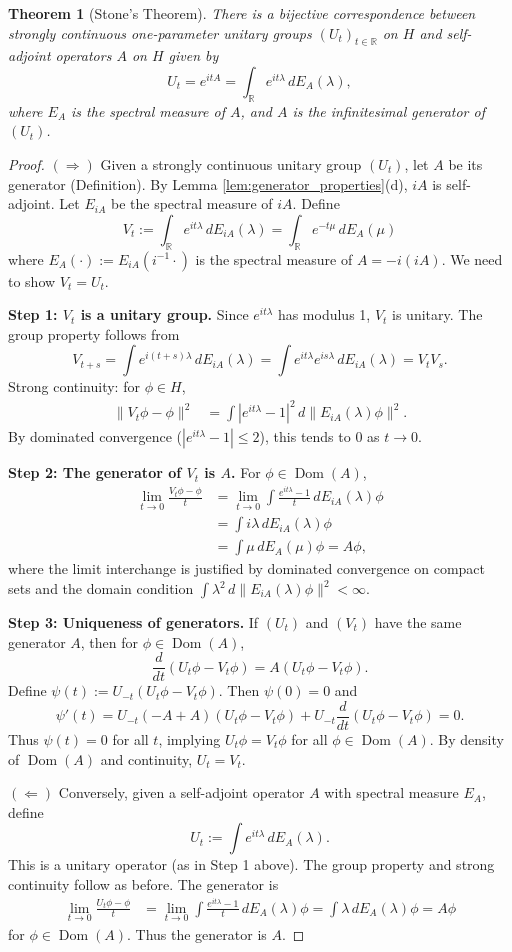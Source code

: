 \documentclass[11pt]{article}
\newtheorem{theorem}{Theorem}[section]
\theoremstyle{definition}
\theoremstyle{remark}
\newcommand{\R}{\mathbb{R}}
\newcommand{\1}{\mathbbm{1}}
\DeclareMathOperator{\Dom}{Dom}
\begin{document}
\begin{theorem}[Stone's Theorem]\label{thm:stone}
There is a bijective correspondence between strongly continuous one-parameter unitary groups $(U_t)_{t\in\R}$ on $H$ and self-adjoint operators $A$ on $H$ given by
\[
U_t=e^{itA}=\int_{\R}e^{it\lambda}\,dE_A(\lambda),
\]
where $E_A$ is the spectral measure of $A$, and $A$ is the infinitesimal generator of $(U_t)$.
\end{theorem}

\begin{proof}
$(\Rightarrow)$ Given a strongly continuous unitary group $(U_t)$, let $A$ be its generator (Definition). By Lemma \ref{lem:generator_properties}(d), $iA$ is self-adjoint. Let $E_{iA}$ be the spectral measure of $iA$. Define
\[
V_t:=\int_{\R}e^{it\lambda}\,dE_{iA}(\lambda)=\int_{\R}e^{-t\mu}\,dE_A(\mu)
\]
where $E_A(\cdot):=E_{iA}(i^{-1}\cdot)$ is the spectral measure of $A=-i(iA)$. We need to show $V_t=U_t$.

\textbf{Step 1: $V_t$ is a unitary group.}
Since $e^{it\lambda}$ has modulus 1, $V_t$ is unitary. The group property follows from
\[
V_{t+s}=\int e^{i(t+s)\lambda}\,dE_{iA}(\lambda)=\int e^{it\lambda}e^{is\lambda}\,dE_{iA}(\lambda)=V_tV_s.
\]
Strong continuity: for $\phi\in H$,
\begin{align*}
\|V_t\phi-\phi\|^2&=\int|e^{it\lambda}-1|^2\,d\|E_{iA}(\lambda)\phi\|^2.
\end{align*}
By dominated convergence ($|e^{it\lambda}-1|\leq 2$), this tends to 0 as $t\to 0$.

\textbf{Step 2: The generator of $V_t$ is $A$.}
For $\phi\in\Dom(A)$,
\begin{align*}
\lim_{t\to 0}\frac{V_t\phi-\phi}{t}&=\lim_{t\to 0}\int\frac{e^{it\lambda}-1}{t}\,dE_{iA}(\lambda)\phi\\
&=\int i\lambda\,dE_{iA}(\lambda)\phi\\
&=\int\mu\,dE_A(\mu)\phi=A\phi,
\end{align*}
where the limit interchange is justified by dominated convergence on compact sets and the domain condition $\int\lambda^2\,d\|E_{iA}(\lambda)\phi\|^2<\infty$.

\textbf{Step 3: Uniqueness of generators.}
If $(U_t)$ and $(V_t)$ have the same generator $A$, then for $\phi\in\Dom(A)$,
\[
\frac{d}{dt}(U_t\phi-V_t\phi)=A(U_t\phi-V_t\phi).
\]
Define $\psi(t):=U_{-t}(U_t\phi-V_t\phi)$. Then $\psi(0)=0$ and
\[
\psi'(t)=U_{-t}(-A+A)(U_t\phi-V_t\phi)+U_{-t}\frac{d}{dt}(U_t\phi-V_t\phi)=0.
\]
Thus $\psi(t)=0$ for all $t$, implying $U_t\phi=V_t\phi$ for all $\phi\in\Dom(A)$. By density of $\Dom(A)$ and continuity, $U_t=V_t$.

$(\Leftarrow)$ Conversely, given a self-adjoint operator $A$ with spectral measure $E_A$, define
\[
U_t:=\int e^{it\lambda}\,dE_A(\lambda).
\]
This is a unitary operator (as in Step 1 above). The group property and strong continuity follow as before. The generator is
\begin{align*}
\lim_{t\to 0}\frac{U_t\phi-\phi}{t}&=\lim_{t\to 0}\int\frac{e^{it\lambda}-1}{t}\,dE_A(\lambda)\phi=\int\lambda\,dE_A(\lambda)\phi=A\phi
\end{align*}
for $\phi\in\Dom(A)$. Thus the generator is $A$.
\end{proof}
\end{document}
